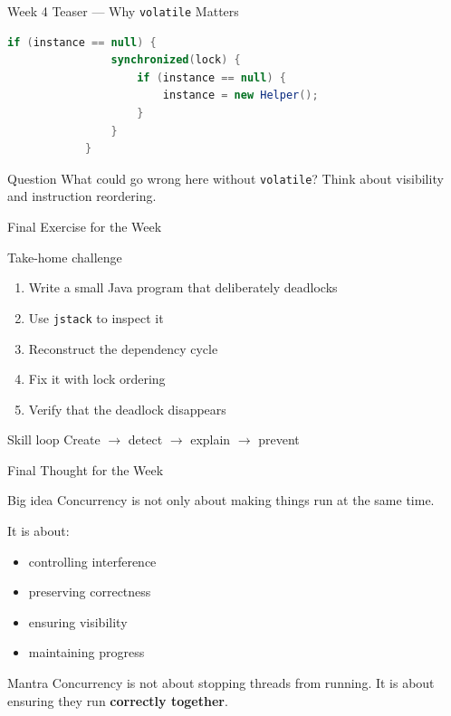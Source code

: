 \documentclass[aspectratio=169,11pt]{beamer}
\begin{document}
	\begin{frame}[fragile]{Week 4 Teaser --- Why \texttt{volatile} Matters}
		\begin{lstlisting}[language=Java]
			if (instance == null) {
				synchronized(lock) {
					if (instance == null) {
						instance = new Helper();
					}
				}
			}
		\end{lstlisting}
		
		\vspace{0.3cm}
		\begin{alertblock}{Question}
			What could go wrong here without \texttt{volatile}?  
			Think about visibility and instruction reordering.
		\end{alertblock}
	\end{frame}
	
	\begin{frame}{Final Exercise for the Week}
		\begin{block}{Take-home challenge}
			\begin{enumerate}
				\item Write a small Java program that deliberately deadlocks
				\item Use \texttt{jstack} to inspect it
				\item Reconstruct the dependency cycle
				\item Fix it with lock ordering
				\item Verify that the deadlock disappears
			\end{enumerate}
		\end{block}
		
		\bigskip
		
		\begin{alertblock}{Skill loop}
			Create \(\rightarrow\) detect \(\rightarrow\) explain \(\rightarrow\) prevent
		\end{alertblock}
	\end{frame}
	
	\begin{frame}{Final Thought for the Week}
		\begin{block}{Big idea}
			Concurrency is not only about making things run at the same time.
		\end{block}
		
		\bigskip
		
		It is about:
		\begin{itemize}
			\item controlling interference
			\item preserving correctness
			\item ensuring visibility
			\item maintaining progress
		\end{itemize}
		
		\bigskip
		
		\begin{alertblock}{Mantra}
			Concurrency is not about stopping threads from running.  
			It is about ensuring they run \textbf{correctly together}.
		\end{alertblock}
	\end{frame}
\end{document}
